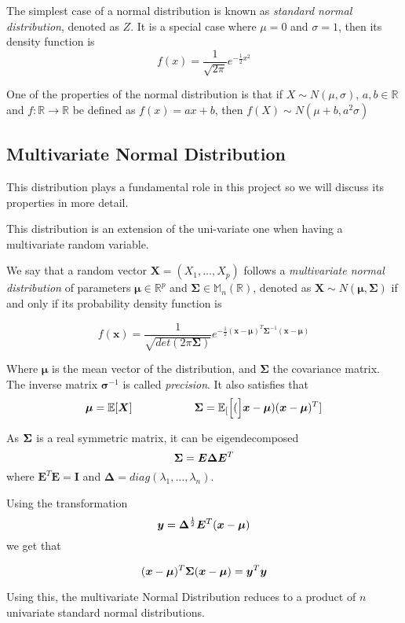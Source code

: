 The simplest case of a normal distribution is known as \emph{standard normal
  distribution}, denoted as \(Z\). It is a special case where \(\mu = 0\) and \(\sigma = 1\), then
its density function is
\[
  f(x) = \frac{1}{\sqrt{2\pi}}e^{-\frac{1}{2}x^2}
\]

One of the properties of the normal distribution is that if \(X \sim N(\mu, \sigma)\), \(a,b \in \mathbb{R}\) and \(f:\mathbb{R} \to \mathbb{R}\) be defined
as \(f(x) = ax + b\), then \(f(X) \sim N(\mu + b, a^2 \sigma)\)

\subsection{Multivariate Normal Distribution}

This distribution plays a fundamental role in this project so we will discuss
its properties in more detail.

This distribution is an extension of the uni-variate one when having a
multivariate random variable.

\begin{definition}
We say that a random vector \(\bm{X} = (X_1,\dots,X_p)\) follows a \emph{multivariate normal
  distribution} of parameters \(\bm{\mu} \in \mathbb{R}^p\) and \(\bm{\Sigma}
\in \mathbb{M}_n(\mathbb{R})\), denoted as \(\bm{X} \sim N(\bm{\mu},
\bm{\Sigma})\) if and only if its probability density function is

\[
  f(\bm{x}) = \frac{1}{\sqrt{det(2\pi \bm{\Sigma})}}e^{-\frac{1}{2}(\bm{x} - \bm{\mu})^T\bm{\Sigma}^{-1}(\bm{x}-\bm{\mu})}
\]

Where \(\bm{\mu}\) is the mean vector of the distribution, and \(\bm{\Sigma}\)
the covariance matrix. The inverse matrix \(\bm{\sigma}^{-1}\) is called \emph{precision}.
It also satisfies that
\[
\bm{\mu} = \mathbb{E}[\bm{X}] \hspace{2cm} \bm{\Sigma} = \mathbb{E}_{[}\Big[(\Big]\bm{x} - \bm{\mu})(\bm{x} - \bm{\mu})^T]
\]

As \(\bm{\Sigma}\) is a real symmetric matrix, it can be eigendecomposed
\[
  \bm{\Sigma} = \bm{E}\bm{\Delta}\bm{E}^T
\]
where \(\bm{E}^T\bm{E} = \bm{I}\) and \(\bm{\Delta} =
diag(\lambda_1,\dots,\lambda_n)\).

Using the transformation
\[
  \bm{y} = \bm{\Delta}^{\frac{1}{2}}\bm{E}^T(\bm{x} - \bm{\mu})
\]
we get that

\[
  (\bm{x} - \bm{\mu})^T\bm{\Sigma}(\bm{x} - \bm{\mu}) = \bm{y}^T\bm{y}
\]

Using this, the multivariate Normal Distribution reduces to a product of \(n\)
univariate standard normal distributions.


\end{definition}

